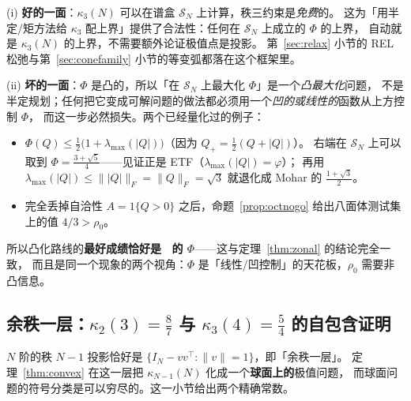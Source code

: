 \begin{remark}[这条定理的两副面孔]\label{rmk:convexread}
(i) \textbf{好的一面}：$\kappa_3(N)$ 可以在谱盒 $\mathcal S_N$ 上计算，秩三约束是\emph{免费}的。
这为「用半定/矩方法给 $\kappa_3$ 配上界」提供了合法性：任何在 $\mathcal S_N$ 上成立的 $\Phi$ 的上界，
自动就是 $\kappa_3(N)$ 的上界，不需要额外论证极值点是投影。
第~\ref{sec:relax} 小节的 REL 松弛与第~\ref{sec:conefamily} 小节的等变弧都落在这个框架里。

(ii) \textbf{坏的一面}：$\Phi$ 是凸的，所以「在 $\mathcal S_N$ 上最大化 $\Phi$」是一个\emph{凸最大化}问题，
不是半定规划；任何把它变成可解问题的做法都必须用一个\emph{凹的或线性的}函数从上方控制 $\Phi$，
而这一步必然损失。两个已经量化过的例子：
\begin{itemize}
\item $\Phi(Q)\le\frac12\bigl(1+\lambda_{\max}(|Q|)\bigr)$（因为 $Q_+=\frac12(Q+|Q|)$）。
右端在 $\mathcal S_N$ 上可以取到 $\Phi=\frac{3+\sqrt5}4$——见证正是 ETF（$\lambda_{\max}(|Q|)=\varphi$）；
再用 $\lambda_{\max}(|Q|)\le\||Q|\|_F=\|Q\|_F=\sqrt3$ 就退化成 Mohar 的 $\frac{1+\sqrt3}2$。
\item 完全丢掉自洽性 $A=1\{Q>0\}$ 之后，命题~\ref{prop:octnogo} 给出八面体测试集上的值 $4/3>\rho_0$。
\end{itemize}
所以凸化路线的\textbf{最好成绩恰好是 \STW\ 的 $\Phi$}——这与定理~\ref{thm:zonal} 的结论完全一致，
而且是同一个现象的两个视角：$\Phi$ 是「线性/凹控制」的天花板，$\rho_0$ 需要非凸信息。
\end{remark}

\subsection{余秩一层：$\kappa_2(3)=\frac87$ 与 $\kappa_3(4)=\frac54$ 的自包含证明}\label{sec:corank1}

$N$ 阶的秩 $N-1$ 投影恰好是 $\{I_N-vv^\top:\|v\|=1\}$，即「余秩一层」。
定理~\ref{thm:convex} 在这一层把 $\kappa_{N-1}(N)$ 化成一个\textbf{球面上的}极值问题，
而球面问题的符号分类是可以穷尽的。这一小节给出两个精确常数。

